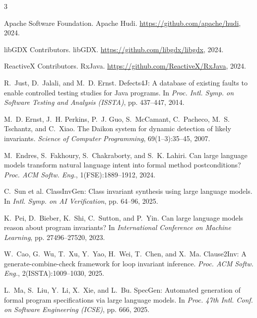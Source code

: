 \documentclass[sigplan,screen]{acmart}
\begin{document}

\begin{thebibliography}{3}

Apache Software Foundation.
Apache Hudi.
\url{https://github.com/apache/hudi}, 2024.

libGDX Contributors.
libGDX.
\url{https://github.com/libgdx/libgdx}, 2024.

ReactiveX Contributors.
RxJava.
\url{https://github.com/ReactiveX/RxJava}, 2024.

R.~Just, D.~Jalali, and M.~D. Ernst.
Defects4J: A database of existing faults to enable controlled testing studies for Java programs.
In \emph{Proc. Intl. Symp. on Software Testing and Analysis (ISSTA)}, pp. 437--447, 2014.

M.~D. Ernst, J.~H. Perkins, P.~J. Guo, S.~McCamant, C.~Pacheco,
M.~S. Tschantz, and C.~Xiao.
The Daikon system for dynamic detection of likely invariants.
\emph{Science of Computer Programming}, 69(1--3):35--45, 2007.

M.~Endres, S.~Fakhoury, S.~Chakraborty, and S.~K. Lahiri.
Can large language models transform natural language intent into formal method postconditions?
\emph{Proc. ACM Softw. Eng.}, 1(FSE):1889--1912, 2024.

C.~Sun et al.
ClassInvGen: Class invariant synthesis using large language models.
In \emph{Intl. Symp. on AI Verification}, pp. 64--96, 2025.

K.~Pei, D.~Bieber, K.~Shi, C.~Sutton, and P.~Yin.
Can large language models reason about program invariants?
In \emph{International Conference on Machine Learning}, pp. 27496--27520, 2023.

W.~Cao, G.~Wu, T.~Xu, Y.~Yao, H.~Wei, T.~Chen, and X.~Ma.
Clause2Inv: A generate-combine-check framework for loop invariant inference.
\emph{Proc. ACM Softw. Eng.}, 2(ISSTA):1009--1030, 2025.

L.~Ma, S.~Liu, Y.~Li, X.~Xie, and L.~Bu.
SpecGen: Automated generation of formal program specifications via large language models.
In \emph{Proc. 47th Intl. Conf. on Software Engineering (ICSE)}, pp. 666, 2025.

\end{thebibliography}
\end{document}
